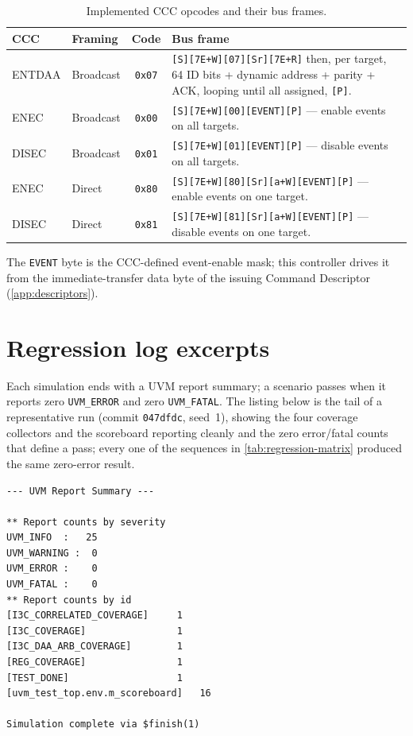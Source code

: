 \begin{table}[!htb]\centering
  \caption{Implemented CCC opcodes and their bus frames.}
  \label{tab:app-ccc-frames}
  \small
  \begin{tabular}{@{}llc>{\raggedright\arraybackslash}p{}@{}}
    \toprule
    \textbf{CCC} & \textbf{Framing} & \textbf{Code} & \textbf{Bus frame} \\
    \midrule
    ENTDAA & Broadcast & \texttt{0x07} &
      \texttt{[S][7E+W][07][Sr][7E+R]} then, per target, 64 ID bits + dynamic address +
      parity + ACK, looping until all assigned, \texttt{[P]}. \\
    \addlinespace
    ENEC   & Broadcast & \texttt{0x00} &
      \texttt{[S][7E+W][00][EVENT][P]} --- enable events on all targets. \\
    DISEC  & Broadcast & \texttt{0x01} &
      \texttt{[S][7E+W][01][EVENT][P]} --- disable events on all targets. \\
    \addlinespace
    ENEC   & Direct    & \texttt{0x80} &
      \texttt{[S][7E+W][80][Sr][a+W][EVENT][P]} --- enable events on one target. \\
    DISEC  & Direct    & \texttt{0x81} &
      \texttt{[S][7E+W][81][Sr][a+W][EVENT][P]} --- disable events on one target. \\
    \bottomrule
  \end{tabular}
\end{table}

The \texttt{EVENT} byte is the CCC-defined event-enable mask; this controller drives it from
the immediate-transfer data byte of the issuing Command Descriptor
(\cref{app:descriptors}).

\chapter{Regression log excerpts}
\label{app:logs}

Each simulation ends with a UVM report summary; a scenario passes when it reports zero
\texttt{UVM\_ERROR} and zero \texttt{UVM\_FATAL}. The listing below is the tail of a
representative run (commit \texttt{047dfdc}, seed~1), showing the four coverage collectors and
the scoreboard reporting cleanly and the zero error/fatal counts that define a pass; every one
of the \RunnableVseqCount{} sequences in \cref{tab:regression-matrix} produced the same
zero-error result.

\begin{lstlisting}[basicstyle=\ttfamily\scriptsize, breaklines=true]
--- UVM Report Summary ---

** Report counts by severity
UVM_INFO  :   25
UVM_WARNING :  0
UVM_ERROR :    0
UVM_FATAL :    0
** Report counts by id
[I3C_CORRELATED_COVERAGE]     1
[I3C_COVERAGE]                1
[I3C_DAA_ARB_COVERAGE]        1
[REG_COVERAGE]                1
[TEST_DONE]                   1
[uvm_test_top.env.m_scoreboard]   16

Simulation complete via $finish(1)
\end{lstlisting}

